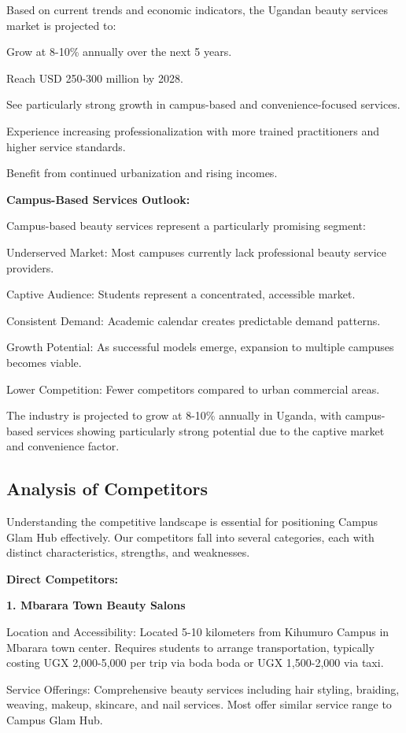 Based on current trends and economic indicators, the Ugandan beauty services market is projected to:

Grow at 8-10\% annually over the next 5 years.

Reach USD 250-300 million by 2028.

See particularly strong growth in campus-based and convenience-focused services.

Experience increasing professionalization with more trained practitioners and higher service standards.

Benefit from continued urbanization and rising incomes.

\textbf{Campus-Based Services Outlook:}

Campus-based beauty services represent a particularly promising segment:

Underserved Market: Most campuses currently lack professional beauty service providers.

Captive Audience: Students represent a concentrated, accessible market.

Consistent Demand: Academic calendar creates predictable demand patterns.

Growth Potential: As successful models emerge, expansion to multiple campuses becomes viable.

Lower Competition: Fewer competitors compared to urban commercial areas.

The industry is projected to grow at 8-10\% annually in Uganda, with campus-based services showing particularly strong potential due to the captive market and convenience factor.

\subsection{Analysis of Competitors}

Understanding the competitive landscape is essential for positioning Campus Glam Hub effectively. Our competitors fall into several categories, each with distinct characteristics, strengths, and weaknesses.

\textbf{Direct Competitors:}

\textbf{1. Mbarara Town Beauty Salons}

Location and Accessibility: Located 5-10 kilometers from Kihumuro Campus in Mbarara town center. Requires students to arrange transportation, typically costing UGX 2,000-5,000 per trip via boda boda or UGX 1,500-2,000 via taxi.

Service Offerings: Comprehensive beauty services including hair styling, braiding, weaving, makeup, skincare, and nail services. Most offer similar service range to Campus Glam Hub.

